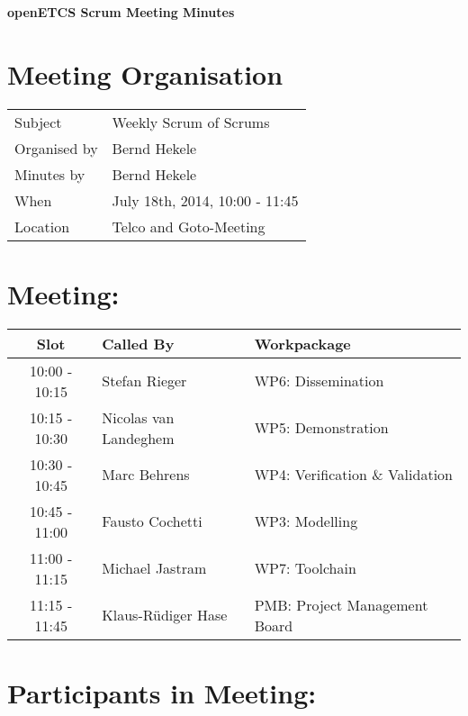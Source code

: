 \documentclass[a4paper, 11pt]{article}
\begin{document}
{\begin{center}\huge\bf openETCS Scrum Meeting Minutes\end{center}}
\section{Meeting Organisation}

\renewcommand{\arraystretch}{1.5}
\begin{supertabular}{m{.2\textwidth}m{.8\textwidth}}
Subject & Weekly Scrum of Scrums\\
Organised by & Bernd Hekele\\
Minutes by & Bernd Hekele\\
When & July 18th, 2014, 10:00 - 11:45\\
Location & Telco and Goto-Meeting\\
\end{supertabular}

\renewcommand{\arraystretch}{1.0}
\section{Meeting:}

\begin{tabular}{|c|l|l|}
\hline
\textbf{Slot} &  \textbf{Called By} & \textbf{Workpackage} \\
\hline  
10:00 - 10:15 & Stefan Rieger & WP6: Dissemination \\\hline  
10:15 - 10:30 & Nicolas van Landeghem & WP5: Demonstration \\\hline  
10:30 - 10:45 & Marc Behrens & WP4: Verification \& Validation \\\hline  
10:45 - 11:00 & Fausto Cochetti & WP3: Modelling \\\hline  
11:00 - 11:15 & Michael Jastram & WP7: Toolchain \\\hline
11:15 - 11:45 & Klaus-R\"udiger Hase & PMB: Project Management Board \\\hline  
\end{tabular}

\section{Participants in Meeting:}
\end{document}
